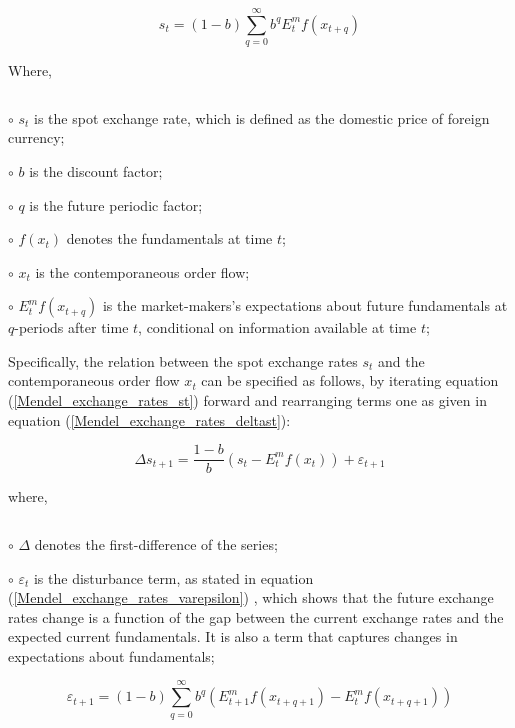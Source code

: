 \begin{equation}
s_t = (1-b)\sum^\infty_{q=0} b^q E^m_t f(x_{t+q})
\label{Mendel_exchange_rates_st}
\end{equation}

Where,
\begin{list}{$$}
%
\item $\circ$ $s_t$ is the spot exchange rate,
which is defined as the domestic price of foreign currency;
%
\item $\circ$ $b$ is the discount factor;
%
\item $\circ$ $q$ is the future periodic factor;
%
\item $\circ$ $f(x_{t})$ denotes the fundamentals at time $t$;
%
\item $\circ$ $x_t$ is the contemporaneous order flow;
%
\item $\circ$ $E^m_t f(x_{t+q})$  is the market-makers's expectations about
future fundamentals at $q$-periods after time $t$, conditional on information
available at time $t$;
\end{list}

Specifically, the relation between the spot exchange rates $s_t$
and the contemporaneous order flow $x_t$ can be specified as follows,
by iterating equation (\ref{Mendel_exchange_rates_st}) forward and
rearranging terms one as given in equation
(\ref{Mendel_exchange_rates_deltast}): %

\begin{equation}
\Delta s_{t+1} = \displaystyle \frac{1-b}{b}\left( s_t - E^m_t
f(x_t) \right) + {\varepsilon_{t+1}}
\label{Mendel_exchange_rates_deltast}
\end{equation}

where,
%
\begin{list}{$$}
%
\item $\circ$ $\Delta$ denotes the first-difference of the series;
%
\item $\circ$ $\varepsilon_t$ is the disturbance term, as stated in
equation (\ref{Mendel_exchange_rates_varepsilon})
\cite{Bacchetta2006}, which shows that the future exchange rates
change is a function of the gap between the current exchange rates
and the expected current fundamentals. It is also a term
that captures changes in expectations about fundamentals;

\begin{equation}
\varepsilon_{t+1} = (1-b)\sum^\infty_{q=0} b^q \left( E^m_{t+1}
f(x_{t+q+1}) - E^m_{t} f(x_{t+q+1}) \right)
\label{Mendel_exchange_rates_varepsilon}
\end{equation}
%
\end{list}



